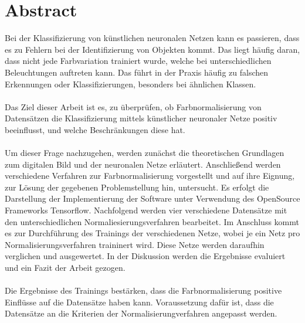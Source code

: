 \chapter*{Abstract}
Bei der Klassifizierung von künstlichen neuronalen Netzen kann es passieren, dass es zu Fehlern bei der Identifizierung von Objekten kommt. Das liegt häufig daran, dass nicht jede Farbvariation trainiert wurde, welche bei unterschiedlichen Beleuchtungen auftreten kann. Das führt in der Praxis häufig zu falschen Erkennungen oder Klassifizierungen, besonders bei ähnlichen Klassen.\\\\
Das Ziel dieser Arbeit ist es, zu überprüfen, ob Farbnormalisierung von Datensätzen die Klassifizierung mittels künstlicher neuronaler Netze positiv beeinflusst, und welche Beschränkungen diese hat.\\\\
Um dieser Frage nachzugehen, werden zunächst die theoretischen Grundlagen zum digitalen Bild und der neuronalen Netze erläutert. Anschließend  werden  verschiedene Verfahren zur Farbnormalisierung vorgestellt und auf ihre Eignung, zur Lösung der gegebenen Problemstellung hin, untersucht. Es erfolgt die Darstellung der Implementierung der Software unter Verwendung des OpenSource Frameworks Tensorflow. Nachfolgend werden vier verschiedene Datensätze mit den unterschiedlichen Normaliesierungsverfahren bearbeitet. Im Anschluss kommt es zur Durchführung des Trainings der verschiedenen Netze, wobei je ein Netz pro Normalisierungsverfahren traininert wird. Diese Netze werden daraufhin verglichen und ausgewertet. In der Diskussion werden die Ergebnisse evaluiert und ein Fazit der Arbeit gezogen.\\\\
Die Ergebnisse des Trainings bestärken, dass die Farbnormalisierung positive Einflüsse auf die Datensätze haben kann. Voraussetzung dafür ist, dass die Datensätze an die Kriterien der Normalisierungverfahren angepasst werden. 
